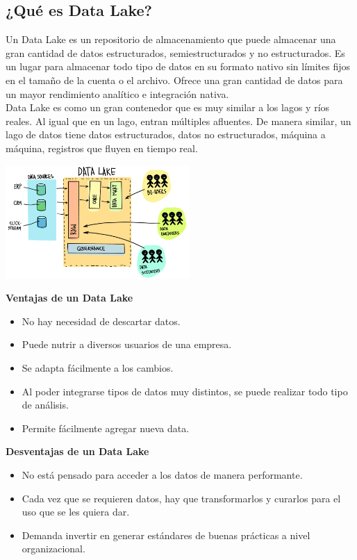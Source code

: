 \documentclass[twoside,twocolumn]{article}
\begin{document}
\subsection{¿Qué es Data Lake?}
\noindent Un Data Lake es un repositorio de almacenamiento que puede almacenar una gran cantidad de datos estructurados, semiestructurados y no estructurados. Es un lugar para almacenar todo tipo de datos en su formato nativo sin límites fijos en el tamaño de la cuenta o el archivo. Ofrece una gran cantidad de datos para un mayor rendimiento analítico e integración nativa.\\[0.1in]
Data Lake es como un gran contenedor que es muy similar a los lagos y ríos reales. Al igual que en un lago, entran múltiples afluentes. De manera similar, un lago de datos tiene datos estructurados, datos no estructurados, máquina a máquina, registros que fluyen en tiempo real.
\begin{center}
    \includegraphics[width=7cm]{./img/img2.png}
\end{center}

\textbf{\large Ventajas de un Data Lake}
\begin{itemize}
    \item No hay necesidad de descartar datos.
    \item Puede nutrir a diversos usuarios de una empresa.
    \item Se adapta fácilmente a los cambios.
    \item Al poder integrarse tipos de datos muy distintos, se puede realizar todo tipo de análisis.
    \item Permite fácilmente agregar nueva data.
\end{itemize}

\textbf{\large Desventajas de un Data Lake}
\begin{itemize}
    \item No está pensado para acceder a los datos de manera performante.
    \item Cada vez que se requieren datos, hay que transformarlos y curarlos para el uso que se les quiera dar.
    \item Demanda invertir en generar estándares de buenas prácticas a nivel organizacional.
\end{itemize}
\end{document}
